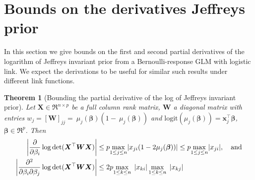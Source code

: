 \documentclass[11pt, a4paper]{article}
\newcommand*{\bb}{\boldsymbol}
\theoremstyle{example} \newtheorem{example}{Example}[section]
\theoremstyle{theorem} \newtheorem{theorem}{Theorem}[section]
\theoremstyle{theorem }\newtheorem{proposition}{Proposition}[section]
\theoremstyle{theorem }\newtheorem{corollary}{Corollary}[section]
\def\det{{\mathop{\rm det}}}
\def\\bbeta{\bb{\\bbeta}}
\begin{document}
	\section{Bounds on the derivatives Jeffreys prior}
\label{sec:jeffreys}
In this section we give bounds on the first and second partial derivatives of the logarithm of Jeffreys invariant prior from a Bernoulli-response GLM with logistic link. We expect the derivations to be useful for similar such results under different link functions. 
 
\begin{theorem}[Bounding the partial derivative of the log of Jeffreys invariant prior]\label{thm:jeffrey_deriv_bound}
	Let $\bb X \in \Re^{n \times p}$ be a full column rank matrix, 
	$\bb W$ a diagonal matrix with entries
	$w_j=[\bb W]_{jj} =~\mu_j(\bb\beta)(1-~\mu_j(\bb\beta))$ 
	and $\text{logit}(\mu_j(\bb\beta)) = \bb x_{j}^\top \bb\beta$, $\bb\beta \in \Re^p$. Then 
	\begin{align}\label{eq:jeffrey_deriv_bound1}
	\left|\frac{\partial }{\partial  \beta_i}\log \det(\bb X^\top\bb W\bb X)\right|  &\leq p\underset{1\leq j\leq n}{\max} |x_{ji}(1-2\mu_j(\bb\beta))| \leq p\underset{1\leq j\leq n}{\max} |x_{ji}|, \quad \text{and} \\ \label{eq:jeffrey_deriv_bound2}
	\left|	\frac{\partial^2}{\partial \beta_i \partial \beta_j} \log\det (\bb X^\top \bb W \bb X)\right| &\leq  2p\underset{1\leq k \leq n}{\max} \; \left|x_{ki}\right| \underset{1\leq k \leq n}{\max} \; \left|x_{kj}\right|
\end{align}
\end{theorem}
\end{document}
